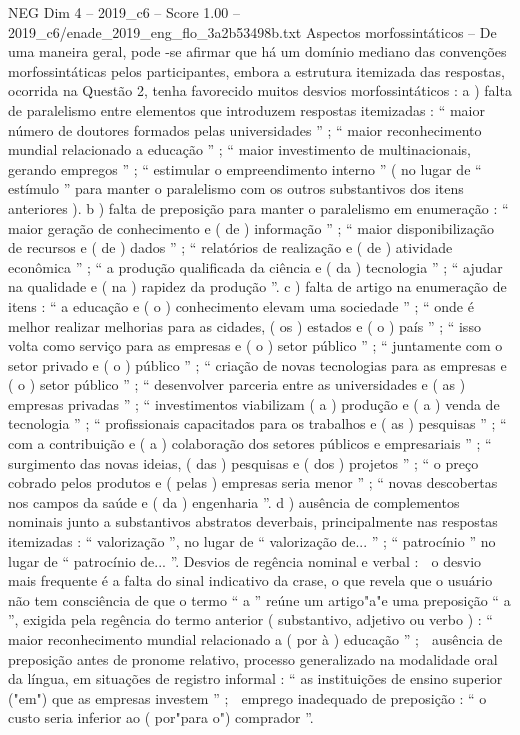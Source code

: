 \begin{textsample}{NEG Dim 4 – 2019\_c6 – Score 1.00 – 2019\_c6/enade\_2019\_eng\_flo\_3a2b53498b.txt}
Aspectos morfossintáticos – De uma maneira geral, pode -se afirmar que há um domínio mediano das convenções morfossintáticas pelos participantes, embora a estrutura itemizada das respostas, ocorrida na Questão 2, tenha favorecido muitos desvios morfossintáticos : a ) falta de paralelismo entre elementos que introduzem respostas itemizadas : “ maior número de doutores formados pelas universidades ” ; “ maior reconhecimento mundial relacionado a educação ” ; “ maior investimento de multinacionais, gerando empregos ” ; “ estimular o empreendimento interno ” ( no lugar de “ estímulo ” para manter o paralelismo com os outros substantivos dos itens anteriores ). b ) falta de preposição para manter o paralelismo em enumeração : “ maior geração de conhecimento e ( de ) informação ” ; “ maior disponibilização de recursos e ( de ) dados ” ; “ relatórios de realização e ( de ) atividade econômica ” ; “ a produção qualificada da ciência e ( da ) tecnologia ” ; “ ajudar na qualidade e ( na ) rapidez da produção ”. c ) falta de artigo na enumeração de itens : “ a educação e ( o ) conhecimento elevam uma sociedade ” ; “ onde é melhor realizar melhorias para as cidades, ( os ) estados e ( o ) país ” ; “ isso volta como serviço para as empresas e ( o ) setor público ” ; “ juntamente com o setor privado e ( o ) público ” ; “ criação de novas tecnologias para as empresas e ( o ) setor público ” ; “ desenvolver parceria entre as universidades e ( as ) empresas privadas ” ; “ investimentos viabilizam ( a ) produção e ( a ) venda de tecnologia ” ; “ profissionais capacitados para os trabalhos e ( as ) pesquisas ” ; “ com a contribuição e ( a ) colaboração dos setores públicos e empresariais ” ; “ surgimento das novas ideias, ( das ) pesquisas e ( dos ) projetos ” ; “ o preço cobrado pelos produtos e ( pelas ) empresas seria menor ” ; “ novas descobertas nos campos da saúde e ( da ) engenharia ”. d ) ausência de complementos nominais junto a substantivos abstratos deverbais, principalmente nas respostas itemizadas : “ valorização ”, no lugar de “ valorização de... ” ; “ patrocínio ” no lugar de “ patrocínio de... ”.
Desvios de regência nominal e verbal :  o desvio mais frequente é a falta do sinal indicativo da crase, o que revela que o usuário não tem consciência de que o termo “ a ” reúne um artigo"a"e uma preposição “ a ”, exigida pela regência do termo anterior ( substantivo, adjetivo ou verbo ) : “ maior reconhecimento mundial relacionado a ( por à ) educação ” ;  ausência de preposição antes de pronome relativo, processo generalizado na modalidade oral da língua, em situações de registro informal : “ as instituições de ensino superior ("em") que as empresas investem ” ;  emprego inadequado de preposição : “ o custo seria inferior ao ( por"para o") comprador ”.

\end{textsample}
